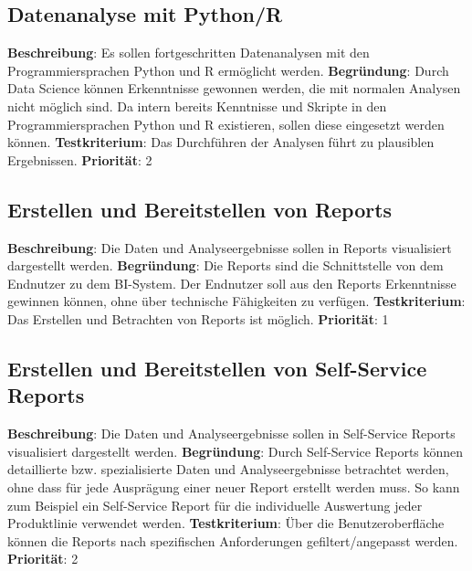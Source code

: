 \subsection{Datenanalyse mit Python/R} \label{sec:anforderungsspezifikation:datenanalysePythonUndR}
\textbf{Beschreibung}: Es sollen fortgeschritten Datenanalysen mit den Programmiersprachen Python und R ermöglicht werden. 
\newline \textbf{Begründung}: Durch Data Science können Erkenntnisse gewonnen werden, die mit normalen Analysen nicht möglich sind. Da intern bereits Kenntnisse und Skripte in den Programmiersprachen Python und R existieren, sollen diese eingesetzt werden können.
\newline \textbf{Testkriterium}: Das Durchführen der Analysen führt zu plausiblen Ergebnissen.
\newline \textbf{Priorität}: 2

\subsection{Erstellen und Bereitstellen von Reports} \label{sec:anforderungsspezifikation:reports}
\textbf{Beschreibung}: Die Daten und Analyseergebnisse sollen in Reports visualisiert dargestellt werden.
\newline \textbf{Begründung}: Die Reports sind die Schnittstelle von dem Endnutzer zu dem BI-System. Der Endnutzer soll aus den Reports Erkenntnisse gewinnen können, ohne über technische Fähigkeiten zu verfügen.
\newline \textbf{Testkriterium}: Das Erstellen und Betrachten von Reports ist möglich.
\newline \textbf{Priorität}: 1

\subsection{Erstellen und Bereitstellen von Self-Service Reports} \label{sec:anforderungsspezifikation:selfServiceReports}
\textbf{Beschreibung}: Die Daten und Analyseergebnisse sollen in Self-Service Reports visualisiert dargestellt werden.
\newline \textbf{Begründung}: Durch Self-Service Reports können detaillierte bzw. spezialisierte Daten und Analyseergebnisse betrachtet werden, ohne dass für jede Ausprägung einer neuer Report erstellt werden muss. So kann zum Beispiel ein Self-Service Report für die individuelle Auswertung jeder Produktlinie verwendet werden.
\newline \textbf{Testkriterium}: Über die Benutzeroberfläche können die Reports nach spezifischen Anforderungen gefiltert/angepasst werden.
\newline \textbf{Priorität}: 2

